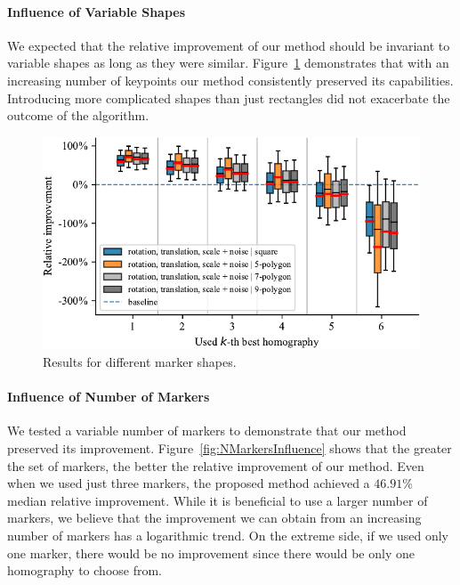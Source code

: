 \paragraph{Influence of Variable Shapes}
We expected that the relative improvement of our method should be invariant to variable shapes as long as they were similar. Figure~\ref{fig:ShapeInfluence} demonstrates that with an increasing number of keypoints our method consistently preserved its capabilities. Introducing more complicated shapes than just rectangles did not exacerbate the outcome of the algorithm.

\begin{figure}[t]
    \centering
    \includegraphics[width=\boxplotimgwidth]{figures/homography/shape_influence.pdf}
    \caption{Results for different marker shapes.}
    \label{fig:ShapeInfluence}
\end{figure}

\paragraph{Influence of Number of Markers}
We tested a variable number of markers to demonstrate that our method preserved its improvement. Figure~\ref{fig:NMarkersInfluence} shows that the greater the set of markers, the better the relative improvement of our method. Even when we used just three markers, the proposed method achieved a $46.91$\% median relative improvement.
While it is beneficial to use a larger number of markers, we believe that the improvement we can obtain from an increasing number of markers has a logarithmic trend. On the extreme side, if we used only one marker, there would be no improvement since there would be only one homography to choose from.

